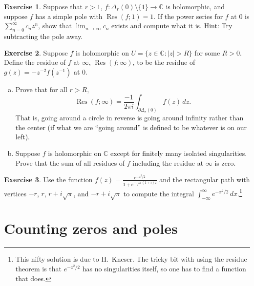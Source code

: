 \documentclass[12pt,openany]{book}
\newcommand{\sabs}[1]{\lvert {#1} \rvert}
\newcommand{\C}{{\mathbb{C}}}
\newcommand{\myquote}[1]{``#1''}
\theoremstyle{plain}
\theoremstyle{remark}
\theoremstyle{definition}
\newenvironment{exbox}{%
    \def\FrameCommand{\vrule width 1pt \relax\hspace{10pt}}%
    \MakeFramed{\advance\hsize-\width\FrameRestore}%
}{%
    \endMakeFramed
}
\newenvironment{exparts}{%
    \leavevmode\begin{enumerate}[a),noitemsep,topsep=0pt,parsep=0pt,partopsep=0pt]
}{%
    \end{enumerate}
}
\theoremstyle{exercise}
\newtheorem{exercise}{Exercise}[section]
\theoremstyle{example}
\begin{document}
\begin{savenotes}
\begin{exbox}
\begin{exercise}
Suppose that $r > 1$, $f \colon \Delta_r(0) \setminus \{ 1 \} \to \C$ is
holomorphic, and suppose $f$ has a simple pole with $\operatorname{Res}(f;1) = 1$.
If the power series for $f$ at $0$ is $\sum_{n=0}^\infty c_n z^n$, show that
$\lim_{n\to \infty} c_n$ exists and compute what it is.  Hint: Try
subtracting the pole away.
\end{exercise}

\begin{exercise}
Suppose $f$ is holomorphic on $U = \{ z \in \C : \sabs{z} > R \}$ for 
some $R > 0$.
Define the residue of $f$ at $\infty$,
$\operatorname{Res}(f;\infty)$, to be the residue
of $g(z) = -z^{-2} f(z^{-1})$ at $0$.
\begin{exparts}
\item
Prove that for all $r > R$,
\begin{equation*}
\operatorname{Res}(f;\infty) = \frac{-1}{2\pi i} \int_{\partial \Delta_r(0)}
f(z) \, dz .
\end{equation*}
That is, going around a circle in reverse is going around infinity rather
than the center (if what we are \myquote{going around} is defined to be whatever
is on our left).
\item
Suppose $f$ is holomorphic on $\C$ except for finitely many isolated
singularities.  Prove that the sum of all residues of $f$ including the
residue at $\infty$ is zero.
\end{exparts}
\end{exercise}

\begin{exercise}
Use the function $f(z) = \frac{e^{-z^2/2}}{1+e^{-\sqrt{\pi}(1+i)z}}$ and
the rectangular path with vertices $-r$, $r$, $r+i\sqrt{\pi}$,
and $-r+i\sqrt{\pi}$
to compute the integral $\int_{-\infty}^\infty e^{-x^2/2} \, dx$.\footnote{%
This nifty solution is due to H.\ Kneser. The tricky bit with using the
residue theorem is that $e^{-z^2/2}$ has no singularities itself,
so one has to find a function that does.}
\end{exercise}
\end{exbox}
\end{savenotes}


\section{Counting zeros and poles}
\end{document}
